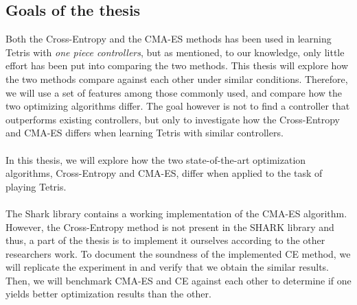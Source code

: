 \subsection{Goals of the thesis}

Both the Cross-Entropy and the CMA-ES methods has been used 
in learning Tetris with \textit{one piece controllers}, but as 
mentioned, to our knowledge, only little effort has been put into 
comparing the two methods. This thesis will explore
how the two methods compare against each other under similar
conditions. Therefore, we will use a set of features among those
commonly used, and compare how the two optimizing algorithms 
differ. The goal however is not to find a controller that 
outperforms existing controllers, but only to investigate 
how the Cross-Entropy and CMA-ES differs when learning Tetris
with similar controllers.\\
\\
In this thesis, we will explore how the two state-of-the-art
optimization algorithms, Cross-Entropy and CMA-ES, differ when 
applied to the task of playing Tetris.\\
\\
The Shark library \citep{shark08} contains a
working implementation of the CMA-ES 
algorithm. However, the Cross-Entropy method 
is not present in the SHARK library and thus, 
a part of the thesis is to implement it ourselves according to 
the other researchers work. To document the 
soundness of the implemented CE method, 
we will replicate the experiment in \citep{thiery:09} and 
verify that we obtain the similar results.\\
Then, we will benchmark CMA-ES and CE against each other 
to determine if one yields better optimization results than the other.
